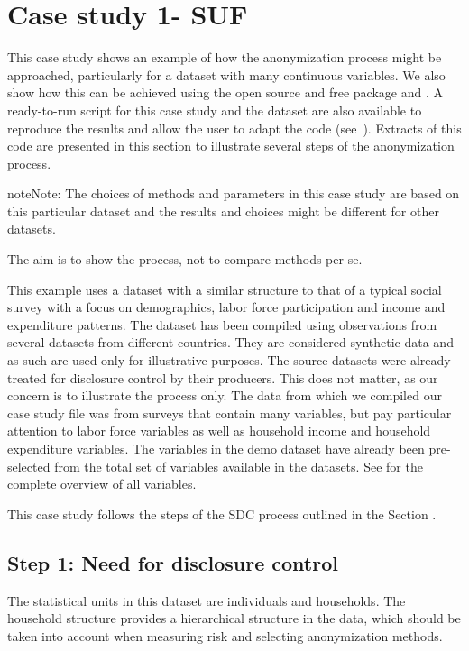 \documentclass[letterpaper,10pt,english]{sphinxmanual}
\begin{document}
\section{Case study 1- SUF}
\label{\detokenize{case_studies:case-study-1-suf}}
This case study shows an example of how the anonymization process might
be approached, particularly for a dataset with many continuous
variables. We also show how this can be achieved using the open source
and free  package and . A ready-to-run  script for this
case study and the dataset are also available to reproduce the results
and allow the user to adapt the code
(see ). Extracts of this code
are presented in this section to illustrate several steps of the anonymization process.

\begin{sphinxadmonition}{note}{Note:}
The choices of methods and parameters in
this case study are based on this particular dataset and the results and
choices might be different for other datasets.
\end{sphinxadmonition}

The aim is to show the process, not to compare methods per se.

This example uses a dataset with a similar structure to that of a
typical social survey with a focus on demographics, labor force
participation and income and expenditure patterns. The dataset has been
compiled using observations from several datasets from different
countries. They are considered synthetic data and as such are used only
for illustrative purposes. The source datasets were already treated for
disclosure control by their producers. This does not matter, as our
concern is to illustrate the process only. The data from which we
compiled our case study file was from surveys that contain many
variables, but pay particular attention to labor force variables as well
as household income and household expenditure variables. The variables
in the demo dataset have already been pre-selected from the total set of
variables available in the datasets. See
for the complete overview of all variables.

This case study follows the steps of the SDC process outlined in the Section
.


\subsection{Step 1: Need for disclosure control}
\label{\detokenize{case_studies:step-1-need-for-disclosure-control}}
The statistical units in this dataset are individuals and households.
The household structure provides a hierarchical structure in the data,
which should be taken into account when measuring risk and selecting
anonymization methods.
\end{document}
